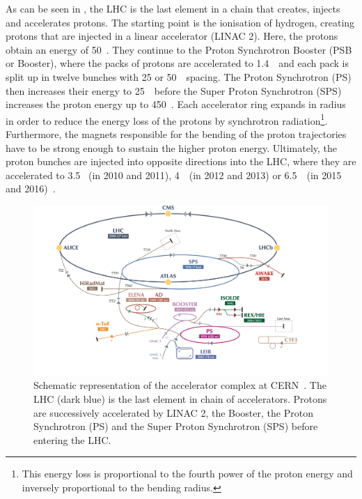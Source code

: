  As can be seen in , the LHC is the last element in a chain that creates, injects and accelerates protons. The starting point is the ionisation of hydrogen, creating protons that are injected in a linear accelerator (LINAC 2). Here, the protons obtain an energy of 50~\MeV. They continue to the Proton Synchrotron Booster (PSB or Booster), where the packs of protons are accelerated to 1.4~\GeV\ and each pack is split up in twelve bunches with 25 or 50~\nano\s\ spacing. The Proton Synchrotron (PS) then increases their energy to 25~\GeV\ before the Super Proton Synchrotron (SPS) increases the proton energy up to 450~\GeV. Each accelerator ring expands in radius in order to reduce the energy loss of the protons by synchrotron radiation\footnote{This energy loss is proportional to the fourth power of the proton energy and inversely proportional to the bending radius.}. Furthermore, the magnets responsible for the bending of the proton trajectories have to be strong enough to sustain the higher proton energy. Ultimately, the proton bunches are injected into opposite directions into the LHC, where they are accelerated to 3.5 \TeV\ (in 2010 and 2011), 4~\TeV\ (in 2012 and 2013) or 6.5~\TeV\ (in 2015 and 2016)~\cite{Wenninger:2254678}. 
  \begin{figure}[h]
 	\centering
 	\includegraphics[width=1.\textwidth]{2_ExperimentalSetup/Figures/CCC-v2016}
 	\caption{Schematic representation of the accelerator complex at CERN~\cite{DeMelis:2197559}. The LHC (dark blue) is the last element in chain of accelerators. Protons are successively accelerated by LINAC 2, the Booster, the Proton Synchrotron (PS) and the Super Proton Synchrotron (SPS) before entering the LHC.}
 	\label{fig:LHCchain}
 \end{figure}

